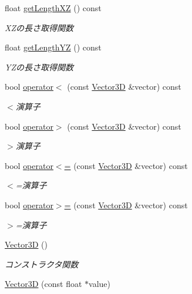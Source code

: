 \begin{DoxyCompactItemize}
float \mbox{\hyperlink{class_vector3_d_ab4884482e69fd58473794e1c260f93e8}{get\+Length\+XZ}} () const
\begin{DoxyCompactList}\small\item\em X\+Zの長さ取得関数 \end{DoxyCompactList}\item 
float \mbox{\hyperlink{class_vector3_d_a2fdf90670c71d3efbe0b9f19dabb83eb}{get\+Length\+YZ}} () const
\begin{DoxyCompactList}\small\item\em Y\+Zの長さ取得関数 \end{DoxyCompactList}\item 
bool \mbox{\hyperlink{class_vector3_d_abe8e87481ed14469de6aae3dbfa0953e}{operator$<$}} (const \mbox{\hyperlink{class_vector3_d}{Vector3D}} \&vector) const
\begin{DoxyCompactList}\small\item\em $<$演算子 \end{DoxyCompactList}\item 
bool \mbox{\hyperlink{class_vector3_d_a06de9e8940880c4241e05533a7ad0db9}{operator$>$}} (const \mbox{\hyperlink{class_vector3_d}{Vector3D}} \&vector) const
\begin{DoxyCompactList}\small\item\em $>$演算子 \end{DoxyCompactList}\item 
bool \mbox{\hyperlink{class_vector3_d_ada60cd10b049b046da1254b83a30f133}{operator$<$=}} (const \mbox{\hyperlink{class_vector3_d}{Vector3D}} \&vector) const
\begin{DoxyCompactList}\small\item\em $<$=演算子 \end{DoxyCompactList}\item 
bool \mbox{\hyperlink{class_vector3_d_a74d53debf36f302abf4d28a9300dae32}{operator$>$=}} (const \mbox{\hyperlink{class_vector3_d}{Vector3D}} \&vector) const
\begin{DoxyCompactList}\small\item\em $>$=演算子 \end{DoxyCompactList}\item 
\mbox{\hyperlink{class_vector3_d_a0b11a8d75da427b27443d8a94d0d296c}{Vector3D}} ()
\begin{DoxyCompactList}\small\item\em コンストラクタ関数 \end{DoxyCompactList}\item 
\mbox{\hyperlink{class_vector3_d_a0e9cf75fc9744dba85c6936a7a5ab791}{Vector3D}} (const float $\ast$value)

\end{DoxyCompactItemize}
